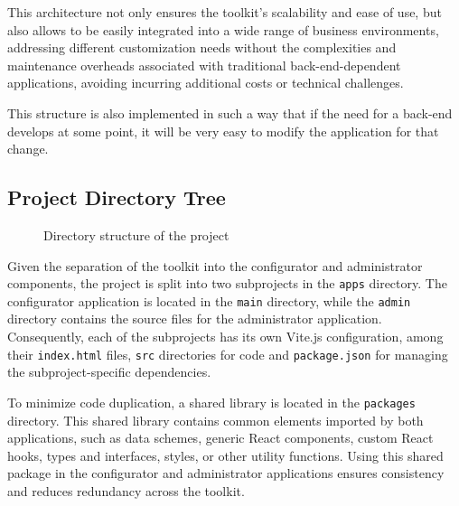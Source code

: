 This architecture not only ensures the toolkit's scalability and ease of use, but also allows to be easily integrated into a wide range of business environments, addressing different customization needs without the complexities and maintenance overheads associated with traditional back-end-dependent applications, avoiding incurring additional costs or technical challenges.

This structure is also implemented in such a way that if the need for a back-end develops at some point, it will be very easy to modify the application for that change.

\subsection{Project Directory Tree}

\begin{figure}[h]
    \centering
    \begin{minipage}{0.4\textwidth}
    \end{minipage}
    \caption{Directory structure of the project}
    \label{fig:directory-tree}
\end{figure}

Given the separation of the toolkit into the configurator and administrator components, the project is split into two subprojects in the \texttt{apps} directory. The configurator application is located in the \texttt{main} directory, while the \texttt{admin} directory contains the source files for the administrator application. Consequently, each of the subprojects has its own Vite.js configuration, among their \texttt{index.html} files, \texttt{src} directories for code and \texttt{package.json} for managing the subproject-specific dependencies. 

To minimize code duplication, a shared library is located in the \texttt{packages} directory. This shared library contains common elements imported by both applications, such as data schemes, generic React components, custom React hooks, types and interfaces,  styles, or other utility functions. Using this shared package in the configurator and administrator applications ensures consistency and reduces redundancy across the toolkit.

